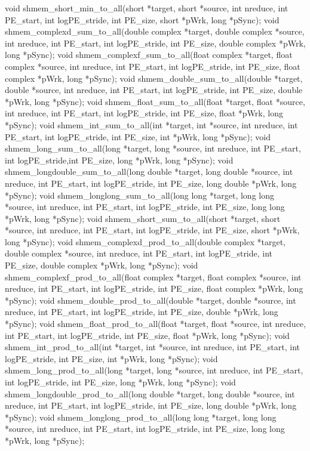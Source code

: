void shmem_short_min_to_all(short *target, short *source, int nreduce, int PE_start, int logPE_stride, int PE_size, short *pWrk, long *pSync);
void shmem_complexd_sum_to_all(double complex *target, double complex *source, int nreduce, int PE_start, int logPE_stride, int PE_size, double complex *pWrk, long *pSync);
void shmem_complexf_sum_to_all(float complex *target, float complex *source, int nreduce, int PE_start, int logPE_stride, int PE_size, float complex *pWrk, long *pSync);
void shmem_double_sum_to_all(double *target, double *source, int nreduce, int PE_start, int logPE_stride, int PE_size, double *pWrk, long *pSync);
void shmem_float_sum_to_all(float *target, float *source, int nreduce, int PE_start, int logPE_stride, int PE_size, float *pWrk, long *pSync);
void shmem_int_sum_to_all(int *target, int *source, int nreduce, int PE_start, int logPE_stride, int PE_size, int *pWrk, long *pSync);
void shmem_long_sum_to_all(long *target, long *source, int nreduce, int PE_start, int logPE_stride,int PE_size, long *pWrk, long *pSync);
void shmem_longdouble_sum_to_all(long double *target, long double *source, int nreduce, int PE_start, int logPE_stride, int PE_size, long double *pWrk, long *pSync);
void shmem_longlong_sum_to_all(long long *target, long long *source, int nreduce, int PE_start, int logPE_stride, int PE_size, long long *pWrk, long *pSync);
void shmem_short_sum_to_all(short *target, short *source, int nreduce, int PE_start, int logPE_stride, int PE_size, short *pWrk, long *pSync);
void shmem_complexd_prod_to_all(double complex *target, double complex *source, int nreduce, int PE_start, int logPE_stride, int PE_size, double complex *pWrk, long *pSync);
void shmem_complexf_prod_to_all(float complex *target, float complex *source, int nreduce, int PE_start, int logPE_stride, int PE_size, float complex *pWrk, long *pSync);
void shmem_double_prod_to_all(double *target, double *source, int nreduce, int PE_start, int logPE_stride, int PE_size, double *pWrk, long *pSync);
void shmem_float_prod_to_all(float *target, float *source, int nreduce, int PE_start, int logPE_stride, int PE_size, float *pWrk, long *pSync);
void shmem_int_prod_to_all(int *target, int *source, int nreduce, int PE_start, int logPE_stride, int PE_size, int *pWrk, long *pSync);
void shmem_long_prod_to_all(long *target, long *source, int nreduce, int PE_start, int logPE_stride, int PE_size, long *pWrk, long *pSync);
void shmem_longdouble_prod_to_all(long double *target, long double *source, int nreduce, int PE_start, int logPE_stride, int PE_size, long double *pWrk, long *pSync);
void shmem_longlong_prod_to_all(long long *target, long long *source, int nreduce, int PE_start, int logPE_stride, int PE_size, long long *pWrk, long *pSync);
